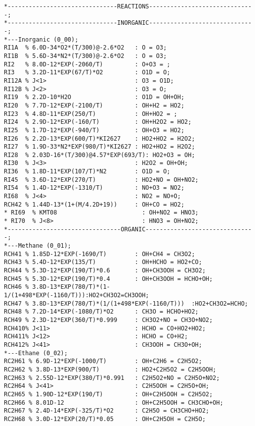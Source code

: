 \begin{verbatim}
*-------------------------------REACTIONS------------------------------;
*-------------------------------INORGANIC------------------------------;
*---Inorganic (0_00);
RI1A  % 6.0D-34*O2*(T/300)@-2.6*O2   : O = O3;
RI1B  % 5.6D-34*N2*(T/300)@-2.6*O2   : O = O3;
RI2   % 8.0D-12*EXP(-2060/T)         : O+O3 = ;
RI3   % 3.2D-11*EXP(67/T)*O2         : O1D = O;
RI12A % J<1>                         : O3 = O1D; 
RI12B % J<2>                         : O3 = O;
RI19  % 2.2D-10*H2O                  : O1D = OH+OH;
RI20  % 7.7D-12*EXP(-2100/T)         : OH+H2 = HO2;
RI23  % 4.8D-11*EXP(250/T)           : OH+HO2 = ;
RI24  % 2.9D-12*EXP(-160/T)          : OH+H2O2 = HO2;
RI25  % 1.7D-12*EXP(-940/T)          : OH+O3 = HO2;
RI26  % 2.2D-13*EXP(600/T)*KI2627    : HO2+HO2 = H2O2;
RI27  % 1.9D-33*N2*EXP(980/T)*KI2627 : HO2+HO2 = H2O2;
RI28  % 2.03D-16*(T/300)@4.57*EXP(693/T): HO2+O3 = OH;
RI30  % J<3>                         : H2O2 = OH+OH;
RI36  % 1.8D-11*EXP(107/T)*N2        : O1D = O;
RI45  % 3.6D-12*EXP(270/T)           : HO2+NO = OH+NO2;
RI54  % 1.4D-12*EXP(-1310/T)         : NO+O3 = NO2;
RI68  % J<4>                         : NO2 = NO+O;
RCH42 % 1.44D-13*(1+(M/4.2D+19))     : OH+CO = HO2; 
* RI69  % KMT08                        : OH+NO2 = HNO3;
* RI70  % J<8>                         : HNO3 = OH+NO2;
*--------------------------------ORGANIC-------------------------------;
*---Methane (0_01);
RCH41 % 1.85D-12*EXP(-1690/T)        : OH+CH4 = CH3O2; 
RCH43 % 5.4D-12*EXP(135/T)           : OH+HCHO = HO2+CO; 
RCH44 % 5.3D-12*EXP(190/T)*0.6       : OH+CH3OOH = CH3O2; 
RCH45 % 5.3D-12*EXP(190/T)*0.4       : OH+CH3OOH = HCHO+OH;    
RCH46 % 3.8D-13*EXP(780/T)*(1-1/(1+498*EXP(-1160/T))):HO2+CH3O2=CH3OOH; 
RCH47 % 3.8D-13*EXP(780/T)*(1/(1+498*EXP(-1160/T)))  :HO2+CH3O2=HCHO; 
RCH48 % 7.2D-14*EXP(-1080/T)*O2      : CH3O = HCHO+HO2;
RCH49 % 2.3D-12*EXP(360/T)*0.999     : CH3O2+NO = CH3O+NO2; 
RCH410% J<11>                        : HCHO = CO+HO2+HO2; 
RCH411% J<12>                        : HCHO = CO+H2; 
RCH412% J<41>                        : CH3OOH = CH3O+OH; 
*---Ethane (0_02);
RC2H61 % 6.9D-12*EXP(-1000/T)        : OH+C2H6 = C2H5O2;
RC2H62 % 3.8D-13*EXP(900/T)          : HO2+C2H5O2 = C2H5OOH;
RC2H63 % 2.55D-12*EXP(380/T)*0.991   : C2H5O2+NO = C2H5O+NO2;
RC2H64 % J<41>                       : C2H5OOH = C2H5O+OH;
RC2H65 % 1.90D-12*EXP(190/T)         : OH+C2H5OOH = C2H5O2;
RC2H66 % 8.01D-12                    : OH+C2H5OOH = CH3CHO+OH;
RC2H67 % 2.4D-14*EXP(-325/T)*O2      : C2H5O = CH3CHO+HO2;
RC2H68 % 3.0D-12*EXP(20/T)*0.05      : OH+C2H5OH = C2H5O;

\end{verbatim}
